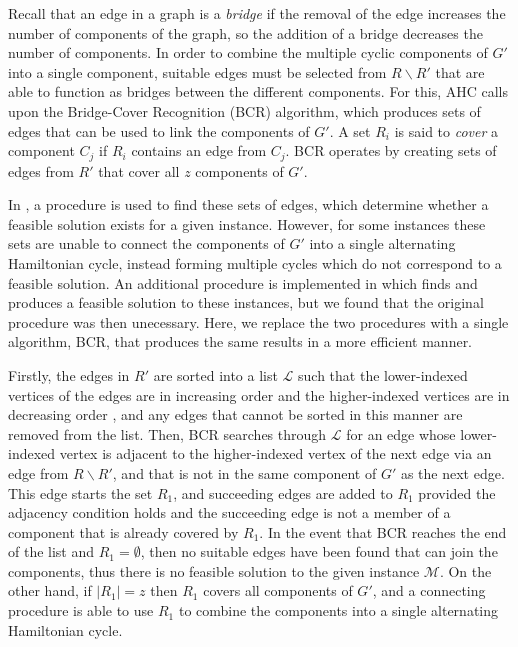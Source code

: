 \documentclass{elsarticle}
\begin{document}
\noindent Recall that an edge in a graph is a \emph{bridge} if the removal of the edge increases the number of components of the graph, so the addition of a bridge decreases the number of components. In order to combine the multiple cyclic components of $G'$ into a single component, suitable edges must be selected from $R \backslash R'$ that are able to function as bridges between the different components. For this, AHC calls upon the Bridge-Cover Recognition (BCR) algorithm, which produces sets of edges that can be used to link the components of $G'$. A set $R_i$ is said to \emph{cover} a component $C_j$ if $R_i$ contains an edge from $C_j$. BCR operates by creating sets of edges from $R'$ that cover all $z$ components of $G'$. 

In \cite{becker2010}, a procedure is used to find these sets of edges, which determine whether a feasible solution exists for a given instance. However, for some instances these sets are unable to connect the components of $G'$ into a single alternating Hamiltonian cycle, instead forming multiple cycles which do not correspond to a feasible solution. An additional procedure is implemented in \cite{hawa2018} which finds and produces a feasible solution to these instances, but we found that the original procedure was then unecessary. Here, we replace the two procedures with a single algorithm, BCR, that produces the same results in a more efficient manner.

Firstly, the edges in $R'$ are sorted into a list $\mathcal{L}$ such that the lower-indexed vertices of the edges are in increasing order and the higher-indexed vertices are in decreasing order , and any edges that cannot be sorted in this manner are removed from the list. Then, BCR searches through $\mathcal{L}$ for an edge whose lower-indexed vertex is adjacent to the higher-indexed vertex of the next edge via an edge from $R \backslash R'$, and that is not in the same component of $G'$ as the next edge. This edge starts the set $R_1$, and succeeding edges are added to $R_1$ provided the adjacency condition holds and the succeeding edge is not a member of a component that is already covered by $R_1$. In the event that BCR reaches the end of the list and $R_1 = \emptyset$, then no suitable edges have been found that can join the components, thus there is no feasible solution to the given instance $\mathcal{M}$. On the other hand, if $|R_1| = z$ then $R_1$ covers all components of $G'$, and a connecting procedure is able to use $R_1$ to combine the components into a single alternating Hamiltonian cycle.
\end{document}
